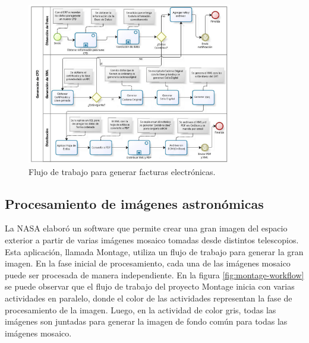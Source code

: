 \begin{figure}
    \begin{center}
        \includegraphics[width=0.8\textwidth]{imagenes/cfd-workflow}
    \end{center}
    \caption{Flujo de trabajo para generar facturas electrónicas.}
    \label{fig:cfd-workflow}
\end{figure}

\subsection{Procesamiento de imágenes astronómicas}

La NASA elaboró un software que permite crear una gran imagen del espacio exterior a partir de varias imágenes mosaico tomadas desde distintos telescopios. Esta aplicación, llamada Montage, utiliza un flujo de trabajo para generar la gran imagen. En la fase inicial de procesamiento, cada una de las imágenes mosaico puede ser procesada de manera independiente. En la figura \ref{fig:montage-workflow} se puede observar que el flujo de trabajo del proyecto Montage inicia con varias actividades en paralelo, donde el color de las actividades representan la fase de procesamiento de la imagen. Luego, en la actividad de color gris, todas las imágenes son juntadas para generar la imagen de fondo común para todas las imágenes mosaico.


